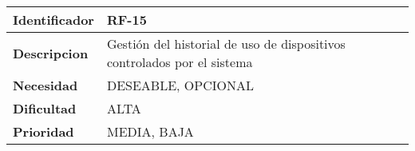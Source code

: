 \begin{center}
    \begin{tabular}{|p{2.6cm}|p{12cm}|}
    \hline
    \textbf{Identificador} & RF-15\\
    \hline
    \textbf{Descripcion} & Gestión del historial de uso de dispositivos controlados por el sistema\\
    \hline
    \textbf{Necesidad} & DESEABLE, OPCIONAL\\
    \hline
    \textbf{Dificultad} & ALTA\\
    \hline
    \textbf{Prioridad} & MEDIA, BAJA\\
    \hline
    \end{tabular}
\end{center}
